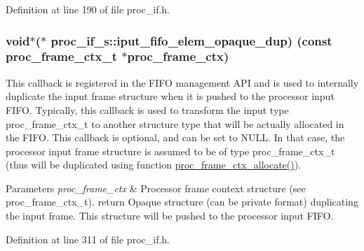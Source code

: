 Definition at line 190 of file proc\+\_\+if.\+h.

\subsubsection[{\texorpdfstring{iput\+\_\+fifo\+\_\+elem\+\_\+opaque\+\_\+dup}{iput_fifo_elem_opaque_dup}}]{\setlength{\rightskip}{0pt plus 5cm}void$\ast$($\ast$ proc\+\_\+if\+\_\+s\+::iput\+\_\+fifo\+\_\+elem\+\_\+opaque\+\_\+dup) (const {\bf proc\+\_\+frame\+\_\+ctx\+\_\+t} $\ast$proc\+\_\+frame\+\_\+ctx)}\hypertarget{structproc__if__s_a558cec57df436699d4154775894f2313}{}\label{structproc__if__s_a558cec57df436699d4154775894f2313}
This callback is registered in the F\+I\+FO management A\+PI and is used to internally duplicate the input frame structure when it is pushed to the processor input F\+I\+FO. Typically, this callback is used to transform the input type proc\+\_\+frame\+\_\+ctx\+\_\+t to another structure type that will be actually allocated in the F\+I\+FO. This callback is optional, and can be set to N\+U\+LL. In that case, the processor input frame structure is assumed to be of type proc\+\_\+frame\+\_\+ctx\+\_\+t (thus will be duplicated using function \textquotesingle{}\hyperlink{proc__if_8c_a26df07b260850afd03ec73572608a034}{proc\+\_\+frame\+\_\+ctx\+\_\+allocate()}\textquotesingle{}). 
\begin{DoxyParams}{Parameters}
{\em proc\+\_\+frame\+\_\+ctx} & Processor frame context structure (see proc\+\_\+frame\+\_\+ctx\+\_\+t). return Opaque structure (can be private format) duplicating the input frame. This structure will be pushed to the processor input F\+I\+FO. \\
\hline
\end{DoxyParams}


Definition at line 311 of file proc\+\_\+if.\+h.

